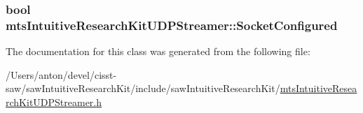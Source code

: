 \subsubsection[{Socket\+Configured}]{\setlength{\rightskip}{0pt plus 5cm}bool mts\+Intuitive\+Research\+Kit\+U\+D\+P\+Streamer\+::\+Socket\+Configured\hspace{0.3cm}{\ttfamily [protected]}}\label{classmts_intuitive_research_kit_u_d_p_streamer_ac662f1d0ff67561e6f38d88d39f4e139}


The documentation for this class was generated from the following file\+:\begin{DoxyCompactItemize}
\item 
/\+Users/anton/devel/cisst-\/saw/saw\+Intuitive\+Research\+Kit/include/saw\+Intuitive\+Research\+Kit/\hyperlink{mts_intuitive_research_kit_u_d_p_streamer_8h}{mts\+Intuitive\+Research\+Kit\+U\+D\+P\+Streamer.\+h}\end{DoxyCompactItemize}
